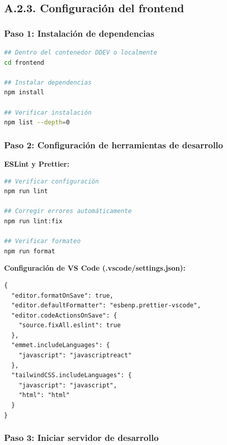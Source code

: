 \documentclass[12pt,a4paper,oneside]{report}
\begin{document}
\subsection{A.2.3. Configuración del
frontend}\label{a.2.3.-configuraciuxf3n-del-frontend}

\subsubsection{Paso 1: Instalación de
dependencias}\label{paso-1-instalaciuxf3n-de-dependencias}

\begin{lstlisting}[language=bash]
## Dentro del contenedor DDEV o localmente
cd frontend

## Instalar dependencias
npm install

## Verificar instalación
npm list --depth=0
\end{lstlisting}

\subsubsection{Paso 2: Configuración de herramientas de
desarrollo}\label{paso-2-configuraciuxf3n-de-herramientas-de-desarrollo}

\textbf{ESLint y Prettier:}

\begin{lstlisting}[language=bash]
## Verificar configuración
npm run lint

## Corregir errores automáticamente
npm run lint:fix

## Verificar formateo
npm run format
\end{lstlisting}

\textbf{Configuración de VS Code (.vscode/settings.json):}

\begin{lstlisting}
{
  "editor.formatOnSave": true,
  "editor.defaultFormatter": "esbenp.prettier-vscode",
  "editor.codeActionsOnSave": {
    "source.fixAll.eslint": true
  },
  "emmet.includeLanguages": {
    "javascript": "javascriptreact"
  },
  "tailwindCSS.includeLanguages": {
    "javascript": "javascript",
    "html": "html"
  }
}
\end{lstlisting}

\subsubsection{Paso 3: Iniciar servidor de
desarrollo}\label{paso-3-iniciar-servidor-de-desarrollo}
\end{document}
